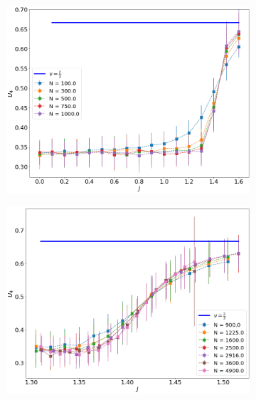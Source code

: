  \begin{figure}[H]
	\centering
	\captionsetup{justification=centering}
	\begin{subfigure}[b]{0.45\textwidth}
		\includegraphics[width=\textwidth]{Images/bindercumulants_shortchains.png}
		\caption{  }
		\label{fig:bcshort_shortbc}
	\end{subfigure}
	\begin{subfigure}[b]{0.45\textwidth}
		\includegraphics[width=\textwidth]{Images/bindercumulants_longchains.png}
		\caption{  }
		\label{fig:bcshort_longbc}
	\end{subfigure}
	\begin{subfigure}[b]{0.45\textwidth}

\end{subfigure}
\end{figure}
